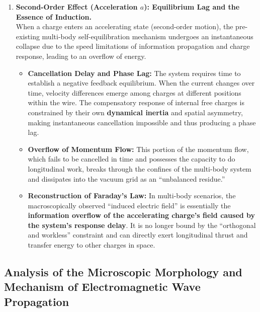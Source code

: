 \documentclass[12pt, a4paper]{article}
\begin{document}
\begin{enumerate}
    \item \textbf{Second-Order Effect (Acceleration $a$): Equilibrium Lag and the Essence of Induction.}\\
    When a charge enters an accelerating state (second-order motion), the pre-existing multi-body self-equilibration mechanism undergoes an instantaneous collapse due to the speed limitations of information propagation and charge response, leading to an overflow of energy.
    \begin{itemize}
        \item \textbf{Cancellation Delay and Phase Lag:} The system requires time to establish a negative feedback equilibrium. When the current changes over time, velocity differences emerge among charges at different positions within the wire. The compensatory response of internal free charges is constrained by their own \textbf{dynamical inertia} and spatial asymmetry, making instantaneous cancellation impossible and thus producing a phase lag.
        \item \textbf{Overflow of Momentum Flow:} This portion of the momentum flow, which fails to be cancelled in time and possesses the capacity to do longitudinal work, breaks through the confines of the multi-body system and dissipates into the vacuum grid as an ``unbalanced residue.''
        \item \textbf{Reconstruction of Faraday's Law:} In multi-body scenarios, the macroscopically observed ``induced electric field'' is essentially the \textbf{information overflow of the accelerating charge's field caused by the system's response delay}. It is no longer bound by the ``orthogonal and workless'' constraint and can directly exert longitudinal thrust and transfer energy to other charges in space.
    \end{itemize}
\end{enumerate}

\subsection{Analysis of the Microscopic Morphology and Mechanism of Electromagnetic Wave Propagation}
\end{document}
